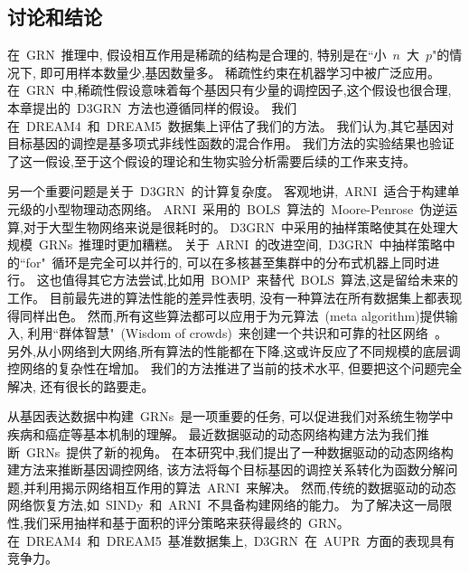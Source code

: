 \subsection{讨论和结论}

在~GRN~推理中, 假设相互作用是稀疏的结构是合理的,
特别是在``小~$n$~大~$p$"的情况下, 即可用样本数量少,基因数量多。
稀疏性约束在机器学习中被广泛应用。
在~GRN~中,稀疏性假设意味着每个基因只有少量的调控因子,这个假设也很合理,
本章提出的~D3GRN~方法也遵循同样的假设。
我们在~DREAM4~和~DREAM5~数据集上评估了我们的方法。
我们认为,其它基因对目标基因的调控是基多项式非线性函数的混合作用。
我们方法的实验结果也验证了这一假设,至于这个假设的理论和生物实验分析需要后续的工作来支持。

另一个重要问题是关于~D3GRN~的计算复杂度。
客观地讲,~ARNI~适合于构建单元级的小型物理动态网络。
ARNI~采用的~BOLS~算法的~Moore-Penrose~伪逆运算,对于大型生物网络来说是很耗时的。
D3GRN~中采用的抽样策略使其在处理大规模~GRNs~推理时更加糟糕。
关于~ARNI~的改进空间,~D3GRN~中抽样策略中的``for"~循环是完全可以并行的,
可以在多核甚至集群中的分布式机器上同时进行。
这也值得其它方法尝试,比如用~BOMP~\cite{majumdar2009fast}来替代~BOLS~算法,这是留给未来的工作。
目前最先进的算法性能的差异性表明,
没有一种算法在所有数据集上都表现得同样出色。
然而,所有这些算法都可以应用于为元算法~(meta algorithm)提供输入,
利用``群体智慧"~(Wisdom of crowds)~来创建一个共识和可靠的社区网络~\cite{Marbach2012a,zheng2008gene}。
另外,从小网络到大网络,所有算法的性能都在下降,这或许反应了不同规模的底层调控网络的复杂性在增加。
我们的方法推进了当前的技术水平, 但要把这个问题完全解决, 还有很长的路要走。

从基因表达数据中构建~GRNs~是一项重要的任务,
可以促进我们对系统生物学中疾病和癌症等基本机制的理解。
最近数据驱动的动态网络构建方法为我们推断~GRNs~提供了新的视角。
在本研究中,我们提出了一种数据驱动的动态网络构建方法来推断基因调控网络,
该方法将每个目标基因的调控关系转化为函数分解问题,并利用揭示网络相互作用的算法~ARNI~来解决。
然而,传统的数据驱动的动态网络恢复方法,如~SINDy~和~ARNI~不具备构建网络的能力。
为了解决这一局限性,我们采用抽样和基于面积的评分策略来获得最终的~GRN。
在~DREAM4~和~DREAM5~基准数据集上,~D3GRN~在~AUPR~方面的表现具有竞争力。